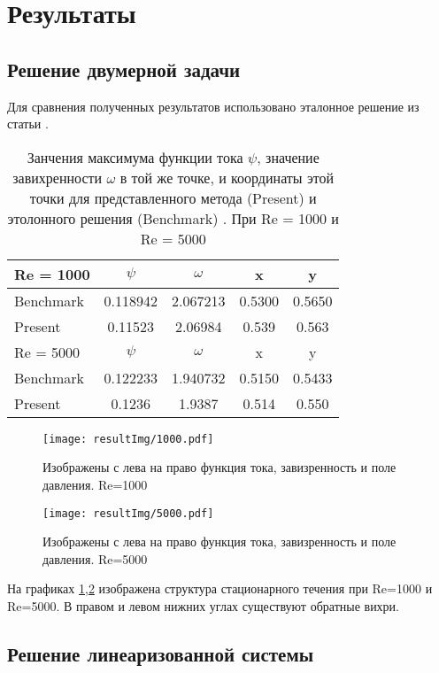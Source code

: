 \section*{Результаты}
\subsection*{Решение двумерной задачи}

Для сравнения полученных результатов использовано эталонное решение из статьи \cite{2DBench}. 

\begin{table}[htp]
\center
  \begin{tabular}{lcccc}
\hline
	Re = 1000 
		& $\psi$   	& $\omega$ 	& x 		& y \\
\hline	
	Benchmark 	& 0.118942 	& 2.067213 	& 0.5300   	& 0.5650 \\
	Present		& 0.11523	& 2.06984	& 0.539		& 0.563 \\
\hline 
\hline
	Re = 5000 
		& $\psi$   	& $\omega$ 	& x 		& y \\
\hline	
	Benchmark 	& 0.122233 	& 1.940732 	& 0.5150   	& 0.5433 \\
	Present		& 0.1236	& 1.9387	& 0.514		& 0.550 \\
\hline 
  \end{tabular}
\caption{Занчения максимума функции тока $\psi$, значение завихренности $\omega$ в той же точке, и координаты этой точки для представленного 
метода (Present) и этолонного решения (Benchmark) \cite{2DBench}. При Re = 1000 и Re = 5000}
\label{comp}
\end{table}



\begin{figure}[htp]
\centering
\texttt{[image: resultImg/1000.pdf]}
\caption{Изображены с лева на право функция тока, завизренность и поле давления. Re=1000}
\label{Re1000}
\end{figure}

\begin{figure}[htp]
\centering
\texttt{[image: resultImg/5000.pdf]}
\caption{Изображены с лева на право функция тока, завизренность и поле давления. Re=5000}
\label{Re5000}
\end{figure}

На графиках \ref{Re1000},\ref{Re5000} изображена структура стационарного течения при Re=1000 и Re=5000. В правом и левом нижних углах существуют обратные вихри.  

\subsection*{Решение линеаризованной системы} 


